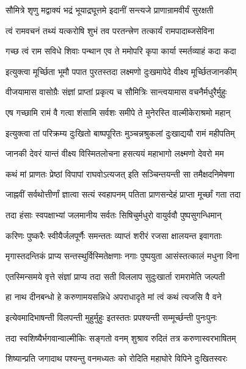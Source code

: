 \twolineshloka
{सौमित्रे शृणु मद्वाक्यं भद्रं भूयाद्रघूत्तमे}
{इदानीं सन्त्यजे प्राणान्रामवीर्यं सुरक्षती}%

\twolineshloka
{त्वं रामवचनं तथ्यं यत्करोषि शुभं तव}
{परतन्त्त्रेण तत्कार्यं रामपादाब्जसेविना}%

\twolineshloka
{गच्छ त्वं राम सविधे शिवाः पन्थान एव ते}
{ममोपरि कृपा कार्या स्मर्तव्याहं कदा कदा}%

\twolineshloka
{इत्युक्त्वा मूर्च्छिता भूमौ पपात पुरतस्तदा}
{लक्ष्मणो दुःखमापेदे वीक्ष्य मूर्च्छितजानकीम्}%

\twolineshloka
{वीजयामास वासोग्रैः संज्ञां प्राप्तां प्रकृत्य च}
{सौमित्रिः सान्त्वयामास वचनैर्मधुरैर्मुहुः}%


\twolineshloka
{एष गच्छामि रामं वै गत्वा शंसामि सर्वशः}
{समीपे ते मुनेरस्ति वाल्मीकेराश्रमो महान्}%

\twolineshloka
{इत्युक्त्वा तां परिक्रम्य दुःखितो बाष्पपूरितः}
{मुञ्चन्नश्रुकलां दुःखाद्ययौ रामं महीपतिम्}%

\twolineshloka
{जानकी देवरं यान्तं वीक्ष्य विस्मितलोचना}
{हसत्ययं महाभागो लक्ष्मणो देवरो मम}%

\twolineshloka
{कथं मां प्राणतः प्रेष्ठां विपापां राघवोऽत्यजत्}
{इति सञ्चिन्तयन्ती सा तमैक्षदनिमेषणा}%

\twolineshloka
{जाह्नवीं सर्वथोत्तीर्णां ज्ञात्वा सत्यं स्वहापनम्}
{पतिता प्राणसन्देहं प्राप्ता मूर्च्छां गता तदा}%

\twolineshloka
{तदा हंसाः स्वपक्षाभ्यां जलमानीय सर्वतः}
{सिषिचुर्मधुरो वायुर्ववौ पुष्पसुगन्धिमान्}%

\twolineshloka
{करिणः पुष्करैः स्वीयैर्जलपूर्णैः समन्ततः}
{व्याप्तं शरीरं रजसा क्षालयन्त इवागताः}%

\twolineshloka
{मृगास्तदन्तिकं प्राप्य सन्तस्थुर्विस्मितेक्षणाः}
{नगाः पुष्पयुता आसंस्तत्कालं मधुना विना}%

\twolineshloka
{एतस्मिन्समये वृत्ते संज्ञां प्राप्य तदा सती}
{विललाप सुदुःखार्ता रामरामेति जल्पती}%

\twolineshloka
{हा नाथ दीनबन्धो हे करुणामयसन्निधे}
{अपराधादृते मां त्वं कथं त्यजसि वै वने}%

\twolineshloka
{इत्येवमादिभाषन्ती विलपन्ती मुहुर्मुहुः}
{इतस्ततः प्रपश्यन्ती सम्मूर्च्छन्ती पुनःपुनः}%

\twolineshloka
{तदा स्वशिष्यैर्भगवान्वाल्मीकिः सङ्गतो वनम्}
{शुश्राव रुदितं तत्र करुणास्वरभाषितम्}%

\twolineshloka
{शिष्यान्प्रति जगादाथ पश्यन्तु वनमध्यतः}
{को रोदिति महाघोरे विपिने दुःखितस्वरः}%


